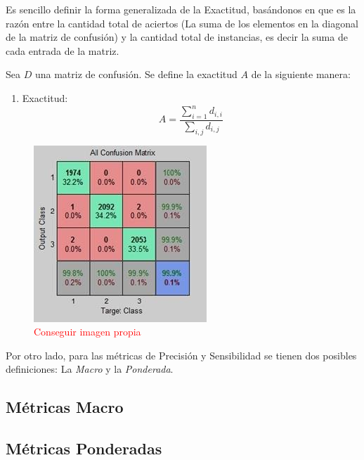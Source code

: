 Es sencillo definir la forma generalizada de la Exactitud, basándonos en que es la razón entre la cantidad total de aciertos (La suma de los elementos en la diagonal de la matriz de confusión) y la cantidad total de instancias, es decir la suma de cada entrada de la matriz.
\begin{definition}
    Sea $D$ una matriz de confusión. Se define la exactitud $A$ de la siguiente manera:
    \begin{enumerate}
        \item Exactitud:
        \begin{equation}
            A = \frac{\sum_{i=1}^n d_{i,i}}{\sum_{i,j} d_{i,j}}
        \end{equation} 
    \end{enumerate}
\end{definition}
\begin{figure}[H]
    \centering
    \includegraphics{../cap5_experimentos/src/confision_multiclase.png}
    \caption{\textcolor{red}{Conseguir imagen propia}}
\end{figure}

Por otro lado, para las métricas de Precisión y Sensibilidad se tienen dos posibles definiciones: La \textsl{Macro} y la \textsl{Ponderada}.


 \subsection{Métricas Macro}

 \subsection{Métricas Ponderadas}
